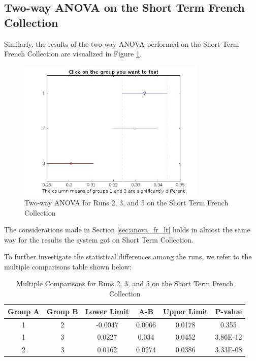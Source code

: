 \newpage
\subsection{Two-way ANOVA on the Short Term French Collection}

Similarly, the results of the two-way \ac{ANOVA} performed on the Short Term French Collection are visualized in Figure \ref{fig:st_anova_french}. 

\begin{figure}[!h]
\centering
\includegraphics[width=0.8\textwidth]{figure/StatisticalAnalysis/AnovaTwoWay/ST_FR.jpg}
\caption{Two-way \ac{ANOVA} for Runs 2, 3, and 5 on the Short Term French Collection}
\label{fig:st_anova_french}
\end{figure}

The considerations made in Section \ref{sec:anova_fr_lt} holds in almost the same way for the results the system got on Short Term Collection.  

To further investigate the statistical differences among the runs, we refer to the multiple comparisons table shown below:

\begin{table}[!h]
\centering
\caption{Multiple Comparisons for Runs 2, 3, and 5 on the Short Term French Collection}
\label{table:st_anova_french}
\begin{tabular}{cccccc}
\hline
Group A & Group B & Lower Limit & A-B & Upper Limit & P-value \\ \hline
1 & 2 & -0.0047 & 0.0066 & 0.0178 & 0.355 \\
1 & 3 & 0.0227 & 0.034 & 0.0452 & 3.86E-12 \\
2 & 3 & 0.0162 & 0.0274 & 0.0386 & 3.33E-08 \\ \hline
\end{tabular}
\end{table}

